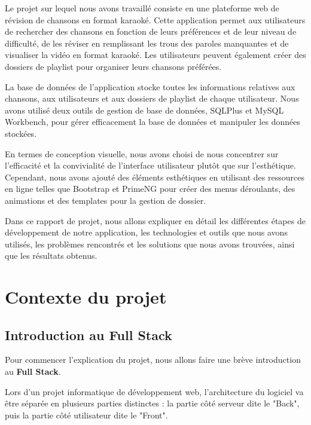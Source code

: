 \documentclass[12pt,french]{article}
\begin{document}
Le projet sur lequel nous avons travaillé consiste en une plateforme web de révision de chansons en format karaoké. Cette application permet aux utilisateurs de rechercher des chansons en fonction de leurs préférences et de leur niveau de difficulté, de les réviser en remplissant les trous des paroles manquantes et de visualiser la vidéo en format karaoké. Les utilisateurs peuvent également créer des dossiers de playlist pour organiser leurs chansons préférées.

\medskip

La base de données de l'application stocke toutes les informations relatives aux chansons, aux utilisateurs et aux dossiers de playlist de chaque utilisateur. Nous avons utilisé deux outils de gestion de base de données, SQLPlus et MySQL Workbench, pour gérer efficacement la base de données et manipuler les données stockées.

\medskip

En termes de conception visuelle, nous avons choisi de nous concentrer sur l'efficacité et la convivialité de l'interface utilisateur plutôt que sur l'esthétique. Cependant, nous avons ajouté des éléments esthétiques en utilisant des ressources en ligne telles que Bootstrap et PrimeNG pour créer des menus déroulants, des animations et des templates pour la gestion de dossier.

\medskip

Dans ce rapport de projet, nous allons expliquer en détail les différentes étapes de développement de notre application, les technologies et outils que nous avons utilisés, les problèmes rencontrés et les solutions que nous avons trouvées, ainsi que les résultats obtenus.


\section{Contexte du projet}

\subsection{Introduction au Full Stack}

Pour commencer l'explication du projet, nous allons faire une brève introduction au \textbf{Full Stack}.

\medskip

Lors d'un projet informatique de développement web, l'architecture du logiciel va être séparée en plusieurs parties distinctes : la partie côté serveur dite le "\gls{Back}", puis la partie côté utilisateur dite le "\gls{Front}".
\end{document}
